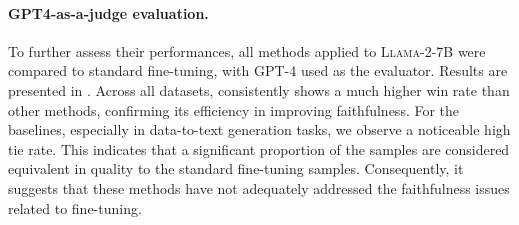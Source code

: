 

\paragraph{GPT4-as-a-judge evaluation.} To further assess their performances, all methods applied to \textsc{Llama-2-7B} were compared to standard fine-tuning, with GPT-4 used as the evaluator. Results are presented in . Across all datasets, \scope consistently shows a much higher win rate than other methods, confirming its efficiency in improving faithfulness. For the baselines, especially in data-to-text generation tasks, we observe a noticeable high tie rate. This indicates that a significant proportion of the samples are considered equivalent in quality to the standard fine-tuning samples. Consequently, it suggests that these methods have not adequately addressed the faithfulness issues related to fine-tuning.





